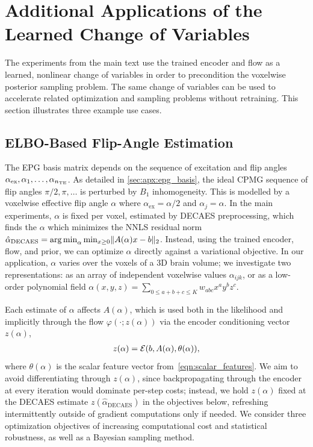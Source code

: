 \section{Additional Applications of the Learned Change of Variables}\label{sec:apx:additional_applications}

The experiments from the main text use the trained encoder and flow as a learned, nonlinear change of variables in order to precondition the voxelwise posterior sampling problem.
The same change of variables can be used to accelerate related optimization and sampling problems without retraining.
This section illustrates three example use cases.

\subsection{\texorpdfstring{\gls*{ELBO}}{ELBO}-Based Flip-Angle Estimation}\label{sec:apx:flip_angle_elbo}

The \gls*{EPG} basis matrix depends on the sequence of excitation and flip angles $\alpha_{\mathrm{ex}}, \alpha_1, \ldots, \alpha_{n_{\mathrm{TE}}}$.
As detailed in \cref{sec:apx:epg_basis}, the ideal \gls*{CPMG} sequence of flip angles $\pi/2, \pi, \ldots$ is perturbed by $B_1$ inhomogeneity.
This is modelled by a voxelwise effective flip angle $\alpha$ where $\alpha_{\mathrm{ex}} = \alpha / 2$ and $\alpha_j = \alpha$.
In the main experiments, $\alpha$ is fixed per voxel, estimated by \gls*{DECAES} preprocessing, which finds the $\alpha$ which minimizes the \gls*{NNLS} residual norm $\hat{\alpha}_{\mathrm{DECAES}} = \operatorname{arg\,min}_{\alpha} \min_{x \ge 0} \lVert A(\alpha) x - b \rVert_2$.
Instead, using the trained encoder, flow, and prior, we can optimize $\alpha$ directly against a variational objective.
In our application, $\alpha$ varies over the voxels of a 3D brain volume;
we investigate two representations:
as an array of independent voxelwise values $\alpha_{ijk}$, or as a low-order polynomial field $\alpha(x, y, z) = \sum_{0 \leq a + b + c \leq K} w_{abc} x^a y^b z^c$.

Each estimate of $\alpha$ affects $A(\alpha)$, which is used both in the likelihood and implicitly through the flow $\varphi(\cdot; z(\alpha))$ via the encoder conditioning vector $z(\alpha)$,
\begin{align}
    z(\alpha) = \mathcal{E}(b, A(\alpha), \theta(\alpha)),
\end{align}
where $\theta(\alpha)$ is the scalar feature vector from~\eqref{eqn:scalar_features}.
We aim to avoid differentiating through $z(\alpha)$, since backpropagating through the encoder at every iteration would dominate per-step costs;
instead, we hold $z(\alpha)$ fixed at the \gls*{DECAES} estimate $z(\hat{\alpha}_{\mathrm{DECAES}})$ in the objectives below, refreshing intermittently outside of gradient computations only if needed.
We consider three optimization objectives of increasing computational cost and statistical robustness, as well as a Bayesian sampling method.

